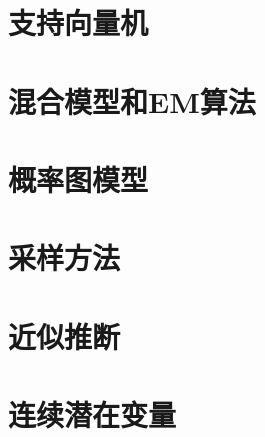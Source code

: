 \chapter{支持向量机}









\chapter{混合模型和EM算法}






\chapter{概率图模型}








\chapter{采样方法}








\chapter{近似推断}








\chapter{连续潜在变量}





